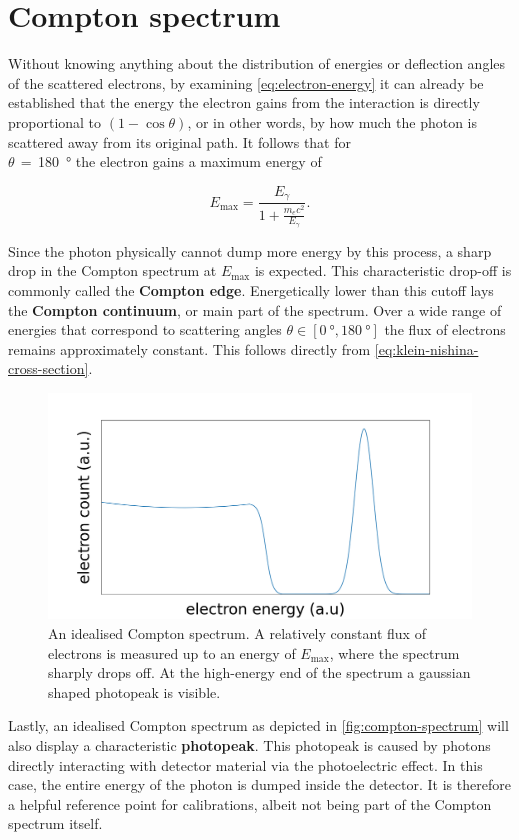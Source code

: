
\section{Compton spectrum}
\label{sec:compton-spectrum}

Without knowing anything about the distribution of energies or deflection angles of 
the scattered electrons, by examining \autoref{eq:electron-energy} it can already be 
established that the energy the electron gains from the interaction is directly
proportional to $\left(1-\cos\theta\right)$, or in other words, by how much the 
photon is scattered away from its original path. It follows that for \\
$\theta\,=\,$\SI{180}{\degree} the electron gains a maximum energy of 

\begin{equation}
\label{eq:maximal-energy}
E_\text{max}=\frac{E_\gamma}{1+\frac{m_e c^2}{E_\gamma}}.
\end{equation}

Since the photon physically cannot dump more energy by this process, a sharp drop in
the Compton spectrum at $E_\text{max}$ is expected. This characteristic drop-off is
commonly called the \textbf{Compton edge}. Energetically lower than this cutoff lays
the \textbf{Compton continuum}, or main part of the spectrum. Over a wide range of 
energies that correspond to scattering angles $\theta\in[\SI{0}{\degree},\SI{180}
{\degree}]$ the flux of electrons remains approximately constant. This follows
directly from \autoref{eq:klein-nishina-cross-section}.

\begin{figure}
	\includegraphics[width=1.0\textwidth]{fig/compton-spectrum}
	\caption{An idealised Compton spectrum. A relatively constant flux of
	electrons is measured up to an energy of $E_\text{max}$, where the spectrum
	sharply drops off. At the high-energy end of the spectrum a gaussian shaped 
	photopeak is visible.}
	\label{fig:compton-spectrum}
\end{figure}

Lastly, an idealised Compton spectrum as depicted in \autoref{fig:compton-spectrum}
will also display a characteristic \textbf{photopeak}. This photopeak is caused by 
photons directly interacting with detector material via the photoelectric effect.
In this case, the entire energy of the photon is dumped inside the detector. It is 
therefore a helpful reference point for calibrations, albeit not being part of the 
Compton spectrum itself.
